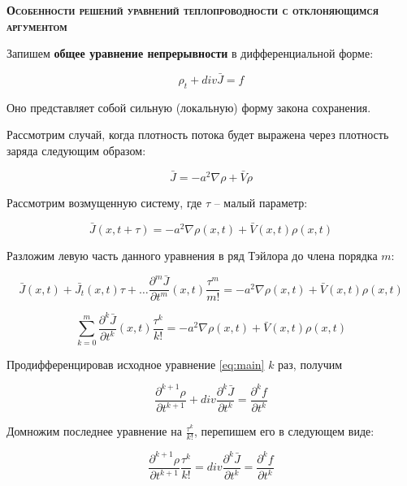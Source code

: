 \begin{center}
\textsc{\textbf{Особенности решений уравнений теплопроводности с отклоняющимся аргументом\\}}
\end{center}

Запишем \textbf{общее уравнение непрерывности} в дифференциальной форме:

\begin{equation}\label{eq:main}
\rho_t + div \bar{J} = f
\end{equation}

Оно представляет собой сильную (локальную) форму закона сохранения.

Рассмотрим случай, когда плотность потока будет выражена через плотность заряда следующим образом:

\begin{equation}
\bar{J} = -a^2 \nabla \rho + \bar{V} \rho
\end{equation}

Рассмотрим возмущенную систему, где $\tau$ \--- малый параметр:

\begin{equation*}
\bar{J}(x,t+\tau) = -a^2 \nabla \rho(x,t) + \bar{V}(x,t) \rho(x,t)
\end{equation*}

Разложим левую часть данного уравнения в ряд Тэйлора до члена порядка $m$:

\begin{equation*}
\bar{J}(x,t) + \bar{J_t}(x,t) \tau + \dots \dfrac{\partial^m \bar{J}}{\partial t^m}(x,t) \dfrac{\tau^m}{m!} = -a^2 \nabla \rho(x,t) + \bar{V}(x,t) \rho(x,t)
\end{equation*}

\begin{equation}\label{eq:sub}
\sum\limits_{k=0}^{m} \dfrac{\partial^k \bar{J}}{\partial t^k}(x,t) \dfrac{\tau^k}{k!} = -a^2 \nabla \rho(x,t) + \bar{V}(x,t) \rho(x,t)
\end{equation}

Продифференцировав исходное уравнение \ref{eq:main} $k$ раз, получим

\begin{equation*}
\dfrac{\partial^{k+1} \rho}{\partial t^{k+1}} + div \dfrac{\partial^k \bar{J}}{\partial t^k} = \dfrac{\partial^k f}{\partial t^k}
\end{equation*}

Домножим последнее уравнение на $\frac{\tau^k}{k!}$, перепишем его в следующем виде:

\begin{equation*}
\dfrac{\partial^{k+1} \rho}{\partial t^{k+1}} \dfrac{\tau^k}{k!} = div \dfrac{\partial^k \bar{J}}{\partial t^k} = \dfrac{\partial^k f}{\partial t^k}
\end{equation*}

